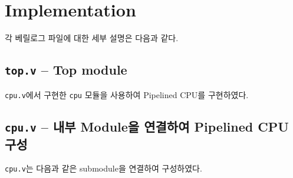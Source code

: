 \documentclass{scrartcl}
\begin{document}
\section{Implementation}
각 베릴로그 파일에 대한 세부 설명은 다음과 같다.

\subsection{\texttt{top.v} -- Top module}
\texttt{cpu.v}에서 구현한 \texttt{cpu} 모듈을 사용하여 Pipelined CPU를 구현하였다.

\subsection{\texttt{cpu.v} -- 내부 Module을 연결하여 Pipelined CPU 구성}
\texttt{cpu.v}는 다음과 같은 submodule을 연결하여 구성하였다.
\end{document}
